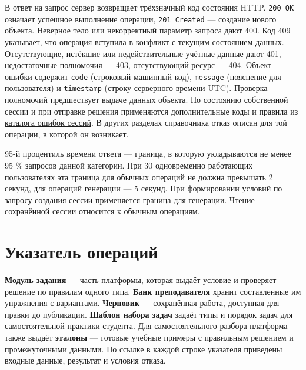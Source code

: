 \documentclass[12pt,a4paper]{article}
\begin{document}
В ответ на запрос сервер возвращает трёхзначный код состояния HTTP. \texttt{200\ OK} означает успешное выполнение операции, \texttt{201\ Created} --- создание нового объекта. Неверное тело или некорректный параметр запроса дают 400. Код 409 указывает, что операция вступила в конфликт с текущим состоянием данных. Отсутствующие, истёкшие или недействительные учётные данные дают 401, недостаточные полномочия --- 403, отсутствующий ресурс --- 404. Объект ошибки содержит \texttt{code} (строковый машинный код), \texttt{message} (пояснение для пользователя) и \texttt{timestamp} (строку серверного времени UTC). Проверка полномочий предшествует выдаче данных объекта. По состоянию собственной сессии и при отправке решения применяются дополнительные коды и правила из {\hyperlink{4-ошибки}{каталога ошибок сессий}}. В других разделах справочника отказ описан для той операции, в которой он возникает.

95-й процентиль времени ответа --- граница, в которую укладываются не менее 95 \% запросов данной категории. При 30 одновременно работающих пользователях эта граница для обычных операций не должна превышать 2 секунд, для операций генерации --- 5 секунд. При формировании условий по запросу создания сессии применяется граница для генерации. Чтение сохранённой сессии относится к обычным операциям.

\section{Указатель операций}\label{ux443ux43aux430ux437ux430ux442ux435ux43bux44c-ux43eux43fux435ux440ux430ux446ux438ux439}

\hypertarget{указатель-операций}{}

\textbf{Модуль задания} --- часть платформы, которая выдаёт условие и проверяет решение по правилам одного типа. \textbf{Банк преподавателя} хранит составленные им упражнения с вариантами. \textbf{Черновик} --- сохранённая работа, доступная для правки до публикации. \textbf{Шаблон набора задач} задаёт типы и порядок задач для самостоятельной практики студента. Для самостоятельного разбора платформа также выдаёт \textbf{эталоны} --- готовые учебные примеры с правильным решением и промежуточными данными. По ссылке в каждой строке указателя приведены входные данные, результат и условия отказа.
\end{document}
